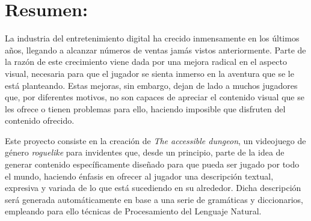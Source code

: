 \section*{Resumen:}

La industria del entretenimiento digital ha crecido inmensamente en los últimos años, llegando a alcanzar números de ventas jamás vistos anteriormente.
Parte de la razón de este crecimiento viene dada por una mejora radical en el aspecto visual, necesaria para que el jugador se sienta inmerso en la aventura que se le está planteando.
Estas mejoras, sin embargo, dejan de lado a muchos jugadores que, por diferentes motivos, no son capaces de apreciar el contenido visual que se les ofrece o tienen problemas para ello, haciendo imposible que disfruten del contenido ofrecido.

Este proyecto consiste en la creación de \textit{The accessible dungeon}, un videojuego de género \textit{roguelike} para invidentes que, desde un principio, parte de la idea de generar contenido específicamente diseñado para que pueda ser jugado por todo el mundo, haciendo énfasis en ofrecer al jugador una descripción textual, expresiva y variada de lo que está sucediendo en su alrededor. Dicha descripción será generada automáticamente en base a una serie de gramáticas y diccionarios, empleando para ello técnicas de Procesamiento del Lenguaje Natural.
